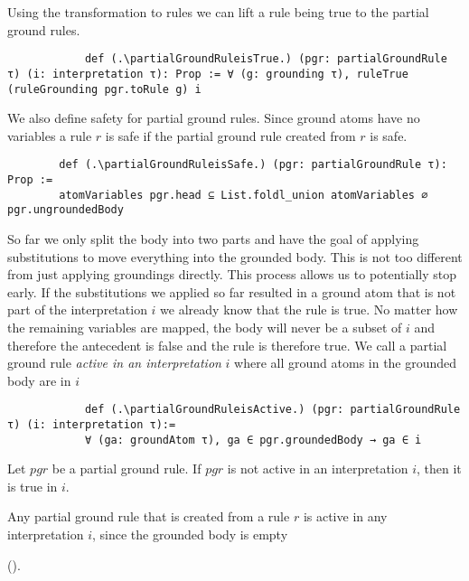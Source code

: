         Using the transformation to rules we can lift a rule being true to the partial ground rules.

        \begin{lstlisting}
            def (.\partialGroundRuleisTrue.) (pgr: partialGroundRule τ) (i: interpretation τ): Prop := ∀ (g: grounding τ), ruleTrue (ruleGrounding pgr.toRule g) i
        \end{lstlisting}

        We also define safety for partial ground rules. Since ground atoms have no variables a rule $r$ is safe if the partial ground rule created from $r$ is safe.

        \begin{lstlisting}     
        def (.\partialGroundRuleisSafe.) (pgr: partialGroundRule τ): Prop :=
        atomVariables pgr.head ⊆ List.foldl_union atomVariables ∅ pgr.ungroundedBody
        \end{lstlisting}

        So far we only split the body into two parts and have the goal of applying substitutions to move everything into the grounded body. This is not too different from just applying groundings directly. 
        This process allows us to potentially stop early. If the substitutions we applied so far resulted in a ground atom that is not part of the interpretation $i$ we already know that the rule is true. No matter how the remaining variables are mapped, the body will never be a subset of $i$ and therefore the antecedent is false and the rule is therefore true. We call a partial ground rule \textit{active in an interpretation} $i$ where all ground atoms in the grounded body are in $i$

        \begin{lstlisting}
            def (.\partialGroundRuleisActive.) (pgr: partialGroundRule τ) (i: interpretation τ):=
            ∀ (ga: groundAtom τ), ga ∈ pgr.groundedBody → ga ∈ i 
        \end{lstlisting}

        \begin{lemma}[\notActiveRuleIsTrue]
            Let $pgr$ be a partial ground rule. If $pgr$ is not active in an interpretation $i$, then it is true in $i$.
        \end{lemma}

        Any partial ground rule that is created from a rule $r$ is active in any interpretation $i$, since the grounded body is empty
        
        (\partialGroundRulefromRuleIsActive).

